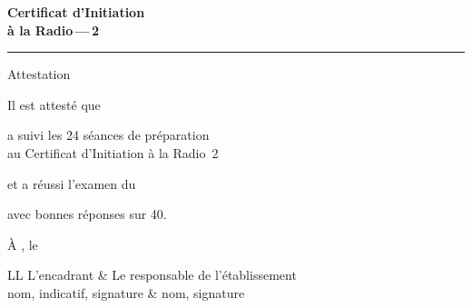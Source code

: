 \documentclass[a5]{BIRdoc}
\begin{document}
\newpage
\thispagestyle{empty}
\vspace*{6mm}
\begin{center}
{\sffamily\bfseries\fontsize{22}{27}\selectfont\color{BIRbleu}Certificat d'Initiation\\ à la Radio\,—\,2\par}
\vspace{3mm}
{\color{BIRrouge}\rule{40mm}{1.2pt}\par}
\vspace{5mm}
{\sffamily\LARGE Attestation\par}
\vspace{14mm}
Il est attesté que\par\vspace{8mm}
\BIRligne[9cm]\par\vspace{8mm}
a suivi les 24 séances de préparation\\ au Certificat d'Initiation à la Radio~2\par
\vspace{5mm}
et a réussi l'examen du \BIRligne[3.5cm]\par
\vspace{3mm}
avec \BIRligne[1.5cm] bonnes réponses sur 40.\par
\vspace{18mm}
À \BIRligne[4cm], le \BIRligne[3cm]\par
\vspace{12mm}
\begin{tabularx}{\linewidth}{LL}
L'encadrant & Le responsable de l'établissement \\[1mm]
{\small nom, indicatif, signature} & {\small nom, signature} \\
\end{tabularx}
\end{center}
\end{document}
